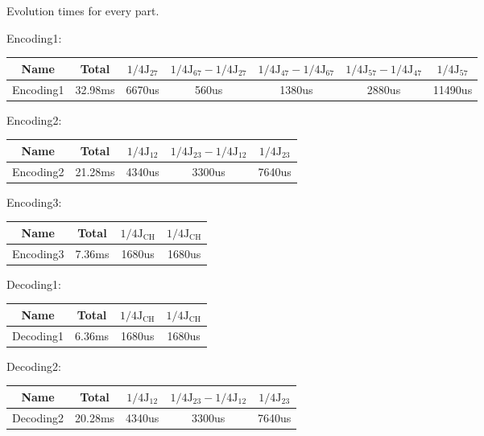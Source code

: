 \documentclass[prl,onecolumn]{revtex4-1}
\begin{document}
Evolution times for every part.

Encoding1:
\begin{table}[hbtp]
\begin{tabular} {c||c|c|c|c|c|c}
  \hline
   Name & Total & $1/4\text{J}_{27}$ & $1/4\text{J}_{67}-1/4\text{J}_{27}$ & $1/4\text{J}_{47}-1/4\text{J}_{67}$ & $1/4\text{J}_{57}-1/4\text{J}_{47}$ & $1/4\text{J}_{57}$\\
  \hline
  Encoding1 & 32.98ms & 6670us & 560us & 1380us & 2880us & 11490us\\
  \hline
\end{tabular}
\end{table}

Encoding2:
\begin{table}[hbtp]
\begin{tabular} {c||c|c|c|c}
  \hline
   Name & Total & $1/4\text{J}_{12}$ & $1/4\text{J}_{23}-1/4\text{J}_{12}$ & $1/4\text{J}_{23}$\\
  \hline
  Encoding2 & 21.28ms & 4340us & 3300us & 7640us\\
  \hline
\end{tabular}
\end{table}

Encoding3:
\begin{table}[hbtp]
\begin{tabular} {c||c|c|c}
  \hline
   Name & Total & $1/4\text{J}_{\text{CH}}$ & $1/4\text{J}_{\text{CH}}$\\
  \hline
  Encoding3 & 7.36ms & 1680us & 1680us\\
  \hline
\end{tabular}
\end{table}

Decoding1:
\begin{table}[!h]
\begin{tabular} {c||c|c|c}
  \hline
   Name & Total & $1/4\text{J}_{\text{CH}}$ & $1/4\text{J}_{\text{CH}}$\\
  \hline
  Decoding1 & 6.36ms & 1680us & 1680us\\
  \hline
\end{tabular}
\end{table}

Decoding2:
\begin{table}[!h]
\begin{tabular} {c||c|c|c|c}
  \hline
   Name & Total & $1/4\text{J}_{12}$ & $1/4\text{J}_{23}-1/4\text{J}_{12}$ & $1/4\text{J}_{23}$\\
  \hline
 Decoding2 & 20.28ms & 4340us & 3300us & 7640us\\
  \hline
\end{tabular}
\end{table}
\end{document}
